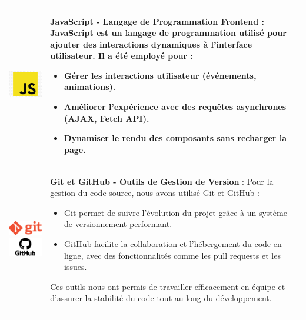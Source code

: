 \begin{longtable}{|m{4cm}|m{10cm}|}
    \includegraphics[width=3cm]{images/logo/javascript.png} & 
    \textbf{JavaScript - Langage de Programmation Frontend} : JavaScript est un langage de programmation utilisé pour ajouter des interactions dynamiques à l'interface utilisateur. Il a été employé pour :  
    \begin{itemize}
        \item Gérer les interactions utilisateur (événements, animations).
        \item Améliorer l'expérience avec des requêtes asynchrones (AJAX, Fetch API).
        \item Dynamiser le rendu des composants sans recharger la page.
    \end{itemize}\\
    \hline

    \includegraphics[width=3cm]{images/logo/git.png}  
    \includegraphics[width=3cm]{images/logo/github.png} & 
    \textbf{Git et GitHub - Outils de Gestion de Version} : Pour la gestion du code source, nous avons utilisé Git et GitHub :  
    \begin{itemize}
        \item Git permet de suivre l'évolution du projet grâce à un système de versionnement performant.
        \item GitHub facilite la collaboration et l'hébergement du code en ligne, avec des fonctionnalités comme les pull requests et les issues.
    \end{itemize}
    Ces outils nous ont permis de travailler efficacement en équipe et d'assurer la stabilité du code tout au long du développement.\\
    \hline


\end{longtable}
